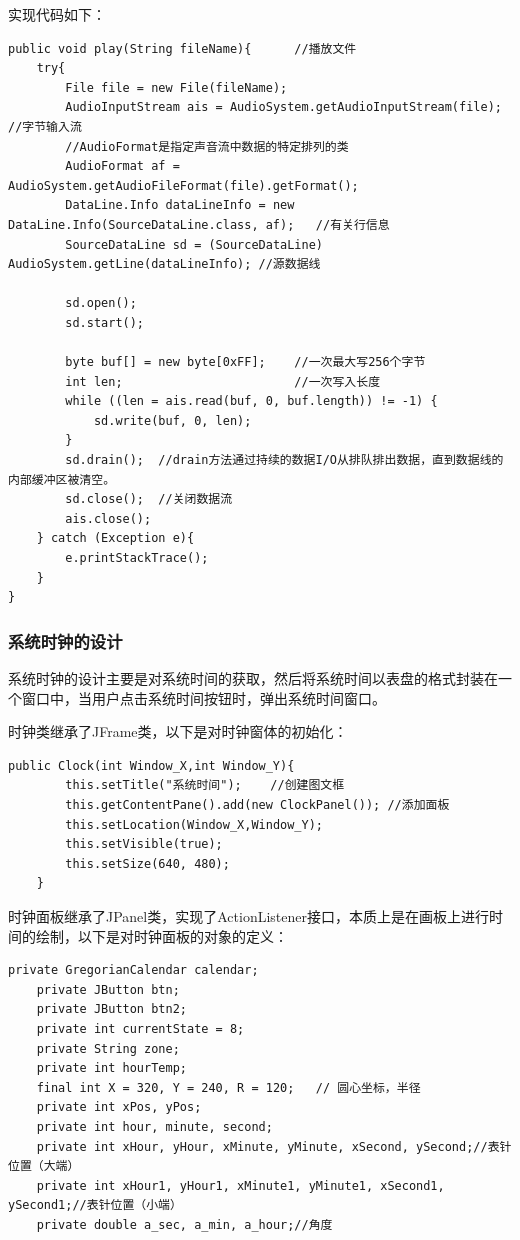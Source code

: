 \documentclass[UTF8,12pt]{article}
\begin{document}
实现代码如下：
\begin{lstlisting}[title=录音文件的播放,frame=shadowbox]
    public void play(String fileName){      //播放文件
    try{
        File file = new File(fileName);
        AudioInputStream ais = AudioSystem.getAudioInputStream(file);   //字节输入流
        //AudioFormat是指定声音流中数据的特定排列的类
        AudioFormat af = AudioSystem.getAudioFileFormat(file).getFormat();
        DataLine.Info dataLineInfo = new DataLine.Info(SourceDataLine.class, af);   //有关行信息
        SourceDataLine sd = (SourceDataLine) AudioSystem.getLine(dataLineInfo); //源数据线

        sd.open();
        sd.start();

        byte buf[] = new byte[0xFF];    //一次最大写256个字节
        int len;                        //一次写入长度
        while ((len = ais.read(buf, 0, buf.length)) != -1) {
            sd.write(buf, 0, len);
        }
        sd.drain();  //drain方法通过持续的数据I/O从排队排出数据，直到数据线的内部缓冲区被清空。
        sd.close();  //关闭数据流
        ais.close();
    } catch (Exception e){
        e.printStackTrace();
    }
}
\end{lstlisting}

\subsubsection{系统时钟的设计}
系统时钟的设计主要是对系统时间的获取，然后将系统时间以表盘的格式封装在一个窗口中，当用户点击系统时间按钮时，弹出系统时间窗口。

时钟类继承了JFrame类，以下是对时钟窗体的初始化：

\begin{lstlisting}[title=时钟窗体的初始化,frame=shadowbox]
    public Clock(int Window_X,int Window_Y){
        this.setTitle("系统时间");    //创建图文框
        this.getContentPane().add(new ClockPanel()); //添加面板
        this.setLocation(Window_X,Window_Y);
        this.setVisible(true);
        this.setSize(640, 480);
    }
\end{lstlisting}

时钟面板继承了JPanel类，实现了ActionListener接口，本质上是在画板上进行时间的绘制，以下是对时钟面板的对象的定义：

\begin{lstlisting}[title=时钟面板的对象的定义,frame=shadowbox]
    private GregorianCalendar calendar;
    private JButton btn;
    private JButton btn2;
    private int currentState = 8;
    private String zone;
    private int hourTemp;
    final int X = 320, Y = 240, R = 120;   // 圆心坐标，半径
    private int xPos, yPos;
    private int hour, minute, second;
    private int xHour, yHour, xMinute, yMinute, xSecond, ySecond;//表针位置（大端）
    private int xHour1, yHour1, xMinute1, yMinute1, xSecond1, ySecond1;//表针位置（小端）
    private double a_sec, a_min, a_hour;//角度
\end{lstlisting}
\end{document}
